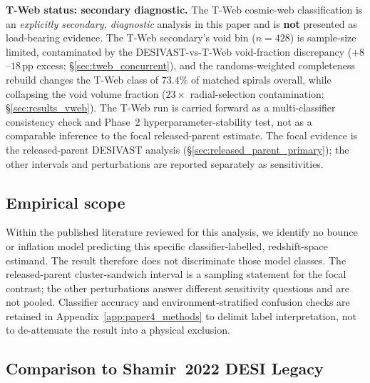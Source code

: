 \documentclass[twocolumn,linenumbers]{aastex702}
\begin{document}
\textbf{T-Web status: secondary diagnostic.} The T-Web
cosmic-web classification is an \emph{explicitly secondary, diagnostic}
analysis in this paper and is \textbf{not} presented as load-bearing
evidence. The T-Web
secondary's void bin ($n=428$) is sample-size limited, contaminated by
the DESIVAST-vs-T-Web void-fraction discrepancy ($+8$--$18$\,pp excess;
\S\ref{sec:tweb_concurrent}), and the randoms-weighted completeness
rebuild changes the T-Web class of $73.4\%$ of matched spirals overall,
while collapsing the void volume fraction ($23\times$ radial-selection contamination;
\S\ref{sec:results_vweb}). The T-Web run is carried forward as a
multi-classifier consistency check and Phase~2 hyperparameter-stability
test, not as a comparable inference to the focal released-parent estimate.
The focal evidence is the released-parent DESIVAST analysis
(\S\ref{sec:released_parent_primary}); the other intervals and
perturbations are reported separately as sensitivities.

\subsection{Empirical scope}

Within the published literature reviewed for this analysis, we identify no
bounce or inflation model predicting this specific classifier-labelled,
redshift-space estimand. The result therefore does
not discriminate those model classes. The released-parent
cluster-sandwich interval is a sampling statement for the focal
contrast; the other perturbations answer different sensitivity
questions and are not pooled. Classifier accuracy and
environment-stratified confusion checks are retained in
Appendix~\ref{app:paper4_methods} to delimit label interpretation, not to
de-attenuate the result into a physical exclusion.

\subsection{Comparison to Shamir~2022 DESI Legacy}
\end{document}
